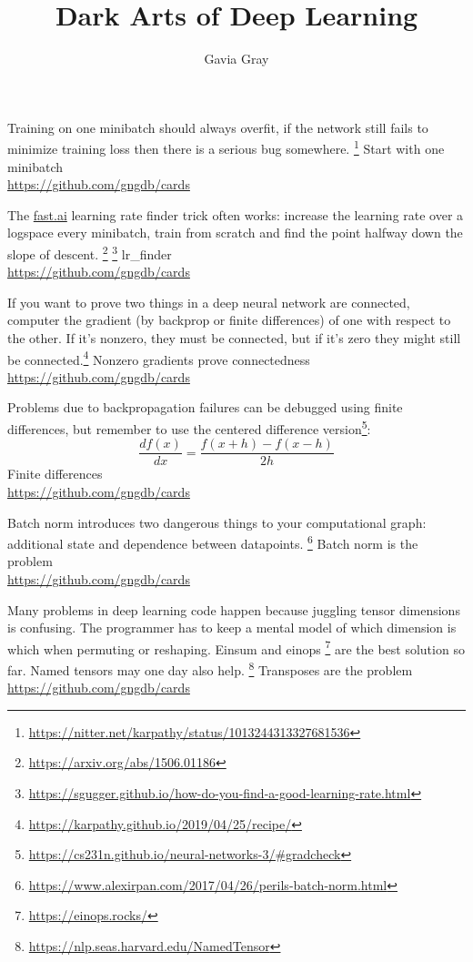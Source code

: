 \documentclass[grid,avery5371]{flashcards}
\title{Dark Arts of Deep Learning}
\author{Gavia Gray}
\newcommand{\cb}[1]{#1 \\ {\small \url{https://github.com/gngdb/cards}}}
\begin{document}
\begin{flashcard}[Karpathy]{%
Training on one minibatch should always overfit, if the network
still fails to minimize training loss then there is a serious bug
somewhere.
\footnote{\small \url{https://nitter.net/karpathy/status/1013244313327681536}}
}
\cb{Start with one minibatch}
\end{flashcard}


\begin{flashcard}{%
The \url{fast.ai} learning rate finder trick often works:
increase the learning rate over a logspace every minibatch,
train from scratch and find the point
halfway down the slope of descent.
\footnote{\small \url{https://arxiv.org/abs/1506.01186}}
\footnote{\small \url{https://sgugger.github.io/how-do-you-find-a-good-learning-rate.html}}
}
\cb{lr\_finder}
\end{flashcard}

\begin{flashcard}[Karpathy]{%
If you want to prove two things in a deep neural network are connected,
computer the gradient (by backprop or finite differences) 
of one with respect to the other. If it's nonzero,
they must be connected, but if it's zero they might still be connected.\footnote{\small \url{https://karpathy.github.io/2019/04/25/recipe/}}}
\cb{Nonzero gradients prove connectedness}
\end{flashcard}

\begin{flashcard}[cs231n]{%
Problems due to backpropagation failures can be debugged using finite
differences, but remember to use the centered difference version\footnote{\small \url{https://cs231n.github.io/neural-networks-3/\#gradcheck}}:
 $$
 \frac{df(x)}{dx} = \frac{f(x+h) - f(x-h)}{2h}
 $$
}
\cb{Finite differences}
\end{flashcard}

\begin{flashcard}[alexirpan]{%
Batch norm introduces two dangerous things to your computational graph:
additional state and dependence between datapoints.
\footnote{\small \url{https://www.alexirpan.com/2017/04/26/perils-batch-norm.html}}
}
\cb{Batch norm is the problem}
\end{flashcard}

\begin{flashcard}[einops]{%
Many problems in deep learning code happen because juggling
tensor dimensions is confusing. The programmer has to keep a mental
model of which dimension is which when permuting or reshaping.
Einsum and einops
\footnote{\small \url{https://einops.rocks/}}
are the best solution so far.
Named tensors may one day also help.
\footnote{\small \url{https://nlp.seas.harvard.edu/NamedTensor}}
}
\cb{Transposes are the problem}
\end{flashcard}
\end{document}
